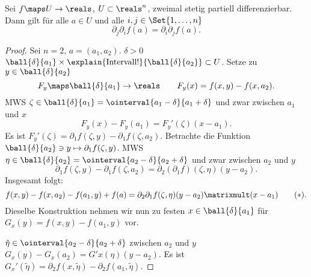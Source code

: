 \begin{satz}\label{schwarzscher_satz}
  Sei \( f\maps U\to \reals \), \( U\subset \reals^n \), zweimal stetig partiell differenzierbar. Dann gilt für alle \( a\in U \) und alle \( i,j\in \Set{1,\dotsc,n} \)
  \begin{equation*}
    \partial_j \partial_i f(a)=\partial_i \partial_j f(a).
  \end{equation*}
\end{satz}
\begin{proof}
  Sei \obda \( n=2 \), \( a=(a_1,a_2) \). \texists \( \delta>0 \) \sd \( \ball{\delta}{a_1}\times \explain{\text{Intervall!}}{\ball{\delta}{a_2}}\subset U \). Setze zu \( y\in \ball{\delta}{a_2} \)
  \begin{equation*}
    F_y\maps \ball{\delta}{a_1}\to \reals\qquad F_y(x)=f(x,y)-f(x,a_2).
  \end{equation*}
  MWS \timplies \texists  \( \zeta\in \ball{\delta}{a_1}=\ointerval{a_1-\delta}{a_1+\delta} \) und zwar zwischen \( a_1 \) und \( x \) \sd 
  \begin{equation*}
    F_y(x)-F_y(a_1)=F_y'(\zeta)(x-a_1).
  \end{equation*}
  Es ist \( F_y'(\zeta)=\partial_1 f(\zeta,y)-\partial_1 f(\zeta,a_2) \). Betrachte die Funktion \( \ball{\delta}{a_2}\ni y\mapsto \partial_1 f(\zeta,y) \). MWS \timplies \texists \( \eta\in \ball{\delta}{a_2}=\ointerval{a_2-\delta}{a_2+\delta} \) und zwar zwischen \( a_2 \) und \( y \) \sd
  \begin{equation*}
    \partial_1 f(\zeta,y)-\partial_1 f(\zeta,a_2)=\partial_2 (\partial_1 f)(\zeta,\eta)(y-a_2).
  \end{equation*}
  Insgesamt folgt:
  \begin{equation*}
    f(x,y)-f(x,a_2)-f(a_1,y)+f(a)=\partial_2\partial_1 f(\zeta,\eta)(y-a_2)\matrixmult(x-a_1)\tag{\(*\)}.\label{eq:schwarzscher_satz:beweis:mws_1}
  \end{equation*}
  Dieselbe Konstruktion nehmen wir nun zu festen \( x\in \ball{\delta}{a_1} \) für \( G_x(y)=f(x,y)-f(a_1,y) \) vor.

  \texists \( \tilde{\eta}\in \ointerval{a_2-\delta}{a_2+\delta} \) zwischen \( a_2 \) und \( y \) \sd \( G_x(y)-G_x(a_2)=G'x(\eta)(y-a_2) \). Es ist \( G_x'(\tilde{\eta})=\partial_2 f(x,\tilde{\eta})-\partial_2 f(a_1,\tilde{\eta}) \).


\end{proof}
